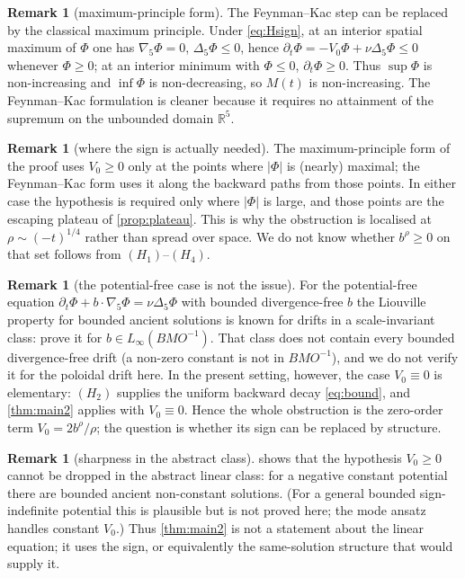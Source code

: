 \documentclass[11pt]{article}
\theoremstyle{definition}
\newtheorem{remark}[theorem]{Remark}
\newcommand{\R}{\mathbb{R}}
\begin{document}
\begin{remark}[maximum-principle form]
The Feynman--Kac step can be replaced by the classical maximum principle.
Under \eqref{eq:Hsign}, at an interior spatial maximum of $\Phi$ one has
$\nabla_5\Phi=0$, $\Delta_5\Phi\le0$, hence
$\partial_t\Phi=-V_0\Phi+\nu\Delta_5\Phi\le0$ whenever $\Phi\ge0$; at an
interior minimum with $\Phi\le0$, $\partial_t\Phi\ge0$. Thus $\sup\Phi$ is
non-increasing and $\inf\Phi$ is non-decreasing, so $M(t)$ is non-increasing.
The Feynman--Kac formulation is cleaner because it requires no attainment of
the supremum on the unbounded domain $\R^5$.
\end{remark}

\begin{remark}[where the sign is actually needed]
The maximum-principle form of the proof uses $V_0\ge0$ only at the points
where $|\Phi|$ is (nearly) maximal; the Feynman--Kac form uses it along the
backward paths from those points. In either case the hypothesis is required
only where $|\Phi|$ is large, and those points are the escaping plateau of
\cref{prop:plateau}. This is why the obstruction is localised at
$\rho\sim(-t)^{1/4}$ rather than spread over space. We do not know whether
$b^\rho\ge0$ on that set follows from $(H_1)$--$(H_4)$.
\end{remark}

\begin{remark}[the potential-free case is not the issue]\label{rem:sssz}
For the potential-free equation $\partial_t\Phi+b\cdot\nabla_5\Phi=\nu\Delta_5\Phi$
with bounded divergence-free $b$ the Liouville property for bounded ancient
solutions is known for drifts in a scale-invariant class: \cite{SSSZ} prove it
for $b\in L_\infty(BMO^{-1})$. That class does not contain every bounded
divergence-free drift (a non-zero constant is not in $BMO^{-1}$), and we do not
verify it for the poloidal drift here. In the present setting, however, the
case $V_0\equiv0$ is elementary: $(H_2)$ supplies the uniform backward decay
\eqref{eq:bound}, and \cref{thm:main2} applies with $V_0\equiv0$. Hence the
whole obstruction is the zero-order term
$V_0=2b^\rho/\rho$; the question is whether its sign can be replaced by
structure.
\end{remark}

\begin{remark}[sharpness in the abstract class]
 shows that the hypothesis $V_0\ge0$ cannot be dropped in the
abstract linear class: for a negative constant potential there are bounded
ancient non-constant solutions. (For a general bounded sign-indefinite
potential this is plausible but is not proved here; the mode ansatz handles
constant $V_0$.) Thus \cref{thm:main2} is not a statement about the linear
equation; it uses the sign, or equivalently the same-solution structure that
would supply it.
\end{remark}
\end{document}
